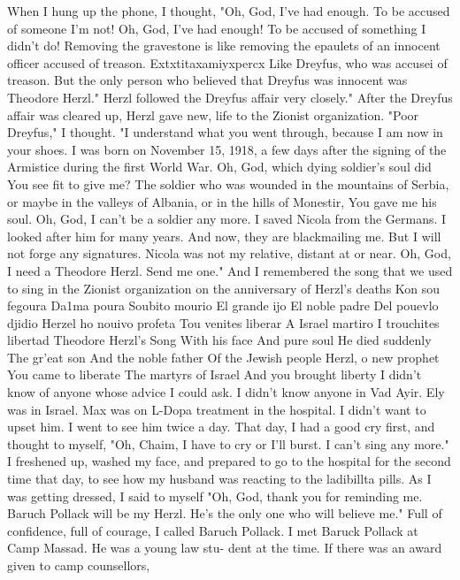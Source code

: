 When I hung up the phone, I thought, "Oh, God, I've had 
enough. To be accused of someone I'm not! Oh, God, I've had enough! To be accused of something I didn't do! Removing the 
gravestone is like removing the epaulets of an innocent officer 
accused of treason. Extxtitaxamiyxpercx Like Dreyfus, who was accusei 
of treason. But the only person who believed that Dreyfus was innocent was Theodore Herzl." Herzl followed the Dreyfus affair very 
closely." After the Dreyfus affair was cleared up, Herzl gave new, 
life to the Zionist organization. "Poor Dreyfus," I thought. "I 
understand what you went through, because I am now in your shoes. I
was born on November 15, 1918, a few days after the signing of the 
Armistice during the first World War. Oh, God, which dying soldier's 
soul did You see fit to give me? The soldier who was wounded in the 
mountains of Serbia, or maybe in the valleys of Albania, or in the 
hills of Monestir, You gave me his soul. Oh, God, I can't be a 
soldier any more. I saved Nicola from the Germans. I looked after 
him for many years. And now, they are blackmailing me. But I will 
not forge any signatures. Nicola was not my relative, distant at 
or near. Oh, God, I need a Theodore Herzl. Send me one." And I 
remembered the song that we used to sing in the Zionist organization on the anniversary of Herzl's deaths 
Kon sou fegoura 
Da1ma poura 
Soubito mourio 
El grande ijo 
El noble padre 
Del pouevlo djidio 
Herzel ho nouivo profeta 
Tou venites liberar 
A Israel martiro 
I trouchites libertad 
Theodore Herzl's Song 
With his face 
And pure soul 
He died suddenly 
The gr'eat son 
And the noble father 
Of the Jewish people 
Herzl, o new prophet 
You came to liberate 
The martyrs of Israel 
And you brought liberty 
I didn't know of anyone whose advice I could ask. I didn't 
know anyone in Vad Ayir. Ely was in Israel. Max was on L-Dopa 
treatment in the hospital. I didn't want to upset him. I went to 
see him twice a day. That day, I had a good cry first, and 
thought to myself, "Oh, Chaim, I have to cry or I'll burst. I can't 
sing any more." 
I freshened up, washed my face, and prepared to go to the hospital for the second time that day, to see how my husband was reacting to the ladibillta pills. As I was getting dressed, I said to 
myself "Oh, God, thank you for reminding me. Baruch Pollack will be 
my Herzl. He's the only one who will believe me." Full of confidence, 
full of courage, I called Baruch Pollack. 
I met Baruck Pollack at Camp Massad. He was a young law stu-
dent at the time. If there was an award given to camp counsellors, 

